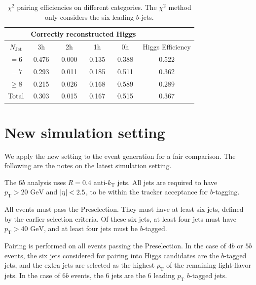 \documentclass[12pt]{article}
\begin{document}
	\begin{table}[htpb]
		\centering
		\caption{$\chi^2$ pairing efficiencies on different categories. The $\chi^2$ method only considers the six leading $b$-jets.}
		\label{tab:chi2_abs_pairing_triHiggs_6b_3h}
		\begin{tabular}{c|cccc|c}
			\multicolumn{1}{l|}{} & \multicolumn{4}{c|}{Correctly reconstructed Higgs} & \multicolumn{1}{l}{} \\ \hline
			$N_\text{Jet}$        & 3h          & 2h         & 1h         & 0h         & Higgs Efficiency     \\ \hline
			$=6$                  & 0.476       & 0.000      & 0.135      & 0.388      & 0.522                \\
			$=7$                  & 0.293       & 0.011      & 0.185      & 0.511      & 0.362                \\
			$\ge 8$               & 0.215       & 0.026      & 0.168      & 0.589      & 0.289                \\ \hline
			Total                 & 0.303       & 0.015      & 0.167      & 0.515      & 0.367               
		\end{tabular}
	\end{table}
\section{New simulation setting}%
\label{sec:new_simulation_setting}
    We apply the new setting to the event generation for a fair comparison. The following are the notes on the latest simulation setting.

    The $6b$ analysis uses $R = 0.4$ anti-$k_{\text{T}}$ jets. All jets are required to have $p_{\text{T}} > 20 \text{ GeV}$ and  $\abs{\eta} < 2.5$, to be within the tracker acceptance for $b$-tagging. 

    All events must pass the Preselection. They must have at least six jets, defined by the earlier selection criteria. Of these six jets, at least four jets must have $p_{\text{T}} > \text{40 GeV}$, and at least four jets must be $b$-tagged.

    Pairing is performed on all events passing the Preselection. In the case of $4b$ or $5b$ events, the six jets considered for pairing into Higgs candidates are the $b$-tagged jets, and the extra jets are selected as the highest $p_{\text{T}}$ of the remaining light-flavor jets. In the case of $6b$ events, the 6 jets are the 6 leading $p_{\text{T}}$ $b$-tagged jets.
\end{document}
